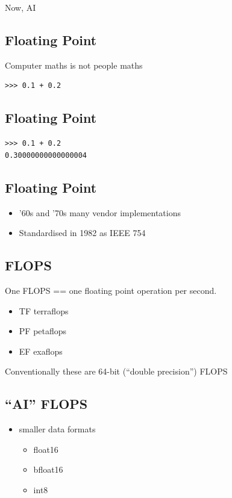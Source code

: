 \documentclass[
  letterpaper,
  DIV=11,
  numbers=noendperiod]{scrartcl}
\providecommand{\tightlist}{%
  \setlength{\itemsep}{0pt}\setlength{\parskip}{0pt}}
\begin{document}
Now, AI

\subsection{Floating Point}\label{floating-point}

Computer maths is not people maths

\begin{verbatim}
>>> 0.1 + 0.2
\end{verbatim}

\subsection{Floating Point}\label{floating-point-1}

\begin{verbatim}
>>> 0.1 + 0.2
0.30000000000000004
\end{verbatim}

\subsection{Floating Point}\label{floating-point-2}

\begin{itemize}
\tightlist
\item
  '60s and '70s many vendor implementations
\item
  Standardised in 1982 as IEEE 754
\end{itemize}

\subsection{FLOPS}\label{flops}

One FLOPS == one floating point operation per second.

\begin{itemize}
\tightlist
\item
  TF terraflops
\item
  PF petaflops
\item
  EF exaflops
\end{itemize}

Conventionally these are 64-bit (``double precision'') FLOPS

\subsection{``AI'' FLOPS}\label{ai-flops}

\begin{itemize}
\tightlist
\item
  smaller data formats

  \begin{itemize}
  \tightlist
  \item
    float16
  \item
    bfloat16
  \item
    int8
  \end{itemize}
\end{itemize}
\end{document}
